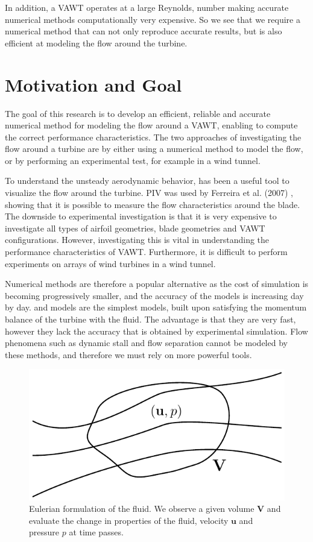 In addition, a VAWT operates at a large Reynolds, number making accurate numerical methods computationally very expensive. So we see that we require a numerical method that can not only reproduce accurate results, but is also efficient at modeling the flow around the turbine.

\section{Motivation and Goal}
The goal of this research is to develop an efficient, reliable and accurate numerical method for modeling the flow around a  VAWT, enabling to compute the correct performance characteristics. The two approaches of investigating the flow around a turbine are by either using a numerical method to model the flow, or by performing an experimental test, for example in a wind tunnel.

To understand the unsteady aerodynamic behavior,  has been a useful tool to visualize the flow around the turbine. PIV was used by Ferreira et al. (2007) \cite{Ferreira2007a}, showing that it is possible to measure the flow characteristics around the blade. The downside to experimental investigation is that it is very expensive to investigate all types of airfoil geometries, blade geometries and VAWT configurations. However, investigating this is vital in understanding the performance characteristics of VAWT. Furthermore, it is difficult to perform experiments on arrays of wind turbines in a wind tunnel.

Numerical methods are therefore a popular alternative as the cost of simulation is becoming progressively smaller, and the accuracy of the models is increasing day by day.  and  models are the simplest models, built upon satisfying the momentum balance of the turbine with the fluid. The advantage is that they are very fast, however they lack the accuracy that is obtained by experimental simulation. Flow phenomena such as dynamic stall and flow separation cannot be modeled by these methods, and therefore we must rely on more powerful tools.

	\begin{figure}[!t]
		\centering
		\includegraphics[width=0.6\linewidth]{figures/introduction/eulerianRF.pdf}
		\caption{Eulerian formulation of the fluid. We observe a given volume $\mathbf{V}$ and evaluate the change in properties of the fluid, velocity $\mathbf{u}$ and pressure $p$ at time passes.}
		\label{fig:eulerianRF}
	\end{figure}

